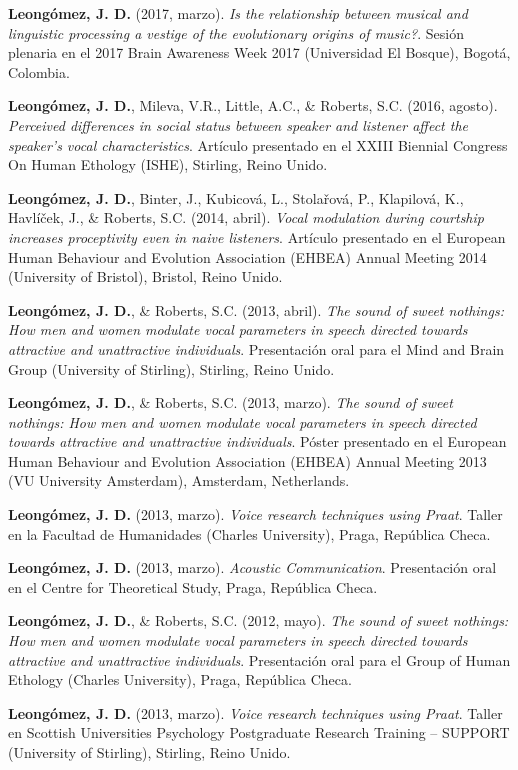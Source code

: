 \documentclass[11pt,a4paper,]{awesome-cv}
\begin{document}
\textbf{Leongómez, J. D.} (2017, marzo). \emph{Is the relationship
between musical and linguistic processing a vestige of the evolutionary
origins of music?}. Sesión plenaria en el 2017 Brain Awareness Week 2017
(Universidad El Bosque), Bogotá, Colombia.

\textbf{Leongómez, J. D.}, Mileva, V.R., Little, A.C., \& Roberts, S.C.
(2016, agosto). \emph{Perceived differences in social status between
speaker and listener affect the speaker's vocal characteristics}.
Artículo presentado en el XXIII Biennial Congress On Human Ethology
(ISHE), Stirling, Reino Unido.

\textbf{Leongómez, J. D.}, Binter, J., Kubicová, L., Stolařová, P.,
Klapilová, K., Havlíček, J., \& Roberts, S.C. (2014, abril). \emph{Vocal
modulation during courtship increases proceptivity even in naive
listeners}. Artículo presentado en el European Human Behaviour and
Evolution Association (EHBEA) Annual Meeting 2014 (University of
Bristol), Bristol, Reino Unido.

\textbf{Leongómez, J. D.}, \& Roberts, S.C. (2013, abril). \emph{The
sound of sweet nothings: How men and women modulate vocal parameters in
speech directed towards attractive and unattractive individuals}.
Presentación oral para el Mind and Brain Group (University of Stirling),
Stirling, Reino Unido.

\textbf{Leongómez, J. D.}, \& Roberts, S.C. (2013, marzo). \emph{The
sound of sweet nothings: How men and women modulate vocal parameters in
speech directed towards attractive and unattractive individuals}. Póster
presentado en el European Human Behaviour and Evolution Association
(EHBEA) Annual Meeting 2013 (VU University Amsterdam), Amsterdam,
Netherlands.

\textbf{Leongómez, J. D.} (2013, marzo). \emph{Voice research techniques
using Praat}. Taller en la Facultad de Humanidades (Charles University),
Praga, República Checa.

\textbf{Leongómez, J. D.} (2013, marzo). \emph{Acoustic Communication}.
Presentación oral en el Centre for Theoretical Study, Praga, República
Checa.

\textbf{Leongómez, J. D.}, \& Roberts, S.C. (2012, mayo). \emph{The
sound of sweet nothings: How men and women modulate vocal parameters in
speech directed towards attractive and unattractive individuals}.
Presentación oral para el Group of Human Ethology (Charles University),
Praga, República Checa.

\textbf{Leongómez, J. D.} (2013, marzo). \emph{Voice research techniques
using Praat}. Taller en Scottish Universities Psychology Postgraduate
Research Training -- SUPPORT (University of Stirling), Stirling, Reino
Unido.
\end{document}
